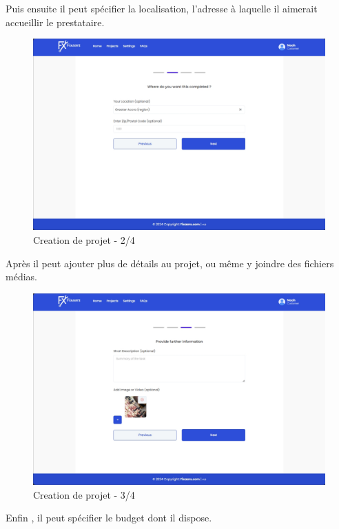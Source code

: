 {Puis ensuite il peut spécifier la localisation, l'adresse à laquelle il aimerait accueillir le prestataire.

\vspace{0.35cm}
\begin{figure}[H]
\begin{center}
\includegraphics[width=12cm]{assets/demo/setup-2.png}
\end{center}
\caption{Creation de projet - 2/4}
\end{figure}

Après il peut ajouter plus de détails au projet, ou même y joindre des fichiers médias.

\vspace{0.35cm}
\begin{figure}[H]
\begin{center}
\includegraphics[width=12cm]{assets/demo/setup-3.png}
\end{center}
\caption{Creation de projet - 3/4}
\end{figure}

Enfin , il peut spécifier le budget dont il dispose.

}
